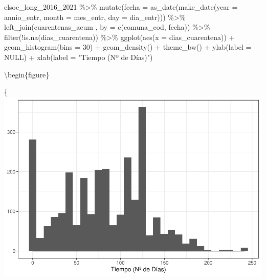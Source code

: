 \documentclass[
  12pt,
]{book}
\newenvironment{Shaded}{\begin{snugshade}}{\end{snugshade}}
\newcommand{\AttributeTok}[1]{\textcolor[rgb]{0.77,0.63,0.00}{#1}}
\newcommand{\ConstantTok}[1]{\textcolor[rgb]{0.00,0.00,0.00}{#1}}
\newcommand{\DecValTok}[1]{\textcolor[rgb]{0.00,0.00,0.81}{#1}}
\newcommand{\FunctionTok}[1]{\textcolor[rgb]{0.00,0.00,0.00}{#1}}
\newcommand{\NormalTok}[1]{#1}
\newcommand{\SpecialCharTok}[1]{\textcolor[rgb]{0.00,0.00,0.00}{#1}}
\newcommand{\StringTok}[1]{\textcolor[rgb]{0.31,0.60,0.02}{#1}}
\begin{document}
\begin{Shaded}
\begin{Highlighting}[]
\NormalTok{elsoc\_long\_2016\_2021 }\SpecialCharTok{\%\textgreater{}\%} 
  \FunctionTok{mutate}\NormalTok{(}\AttributeTok{fecha =} \FunctionTok{as\_date}\NormalTok{(}\FunctionTok{make\_date}\NormalTok{(}\AttributeTok{year =}\NormalTok{ annio\_entr, }\AttributeTok{month =}\NormalTok{ mes\_entr, }\AttributeTok{day =}\NormalTok{ dia\_entr))) }\SpecialCharTok{\%\textgreater{}\%} 
  \FunctionTok{left\_join}\NormalTok{(cuarentenas\_acum , }\AttributeTok{by =} \FunctionTok{c}\NormalTok{(}\StringTok{\textquotesingle{}comuna\_cod\textquotesingle{}}\NormalTok{, }\StringTok{\textquotesingle{}fecha\textquotesingle{}}\NormalTok{)) }\SpecialCharTok{\%\textgreater{}\%} 
  \FunctionTok{filter}\NormalTok{(}\SpecialCharTok{!}\FunctionTok{is.na}\NormalTok{(dias\_cuarentena)) }\SpecialCharTok{\%\textgreater{}\%} 
  \FunctionTok{ggplot}\NormalTok{(}\FunctionTok{aes}\NormalTok{(}\AttributeTok{x =}\NormalTok{ dias\_cuarentena)) }\SpecialCharTok{+} 
  \FunctionTok{geom\_histogram}\NormalTok{(}\AttributeTok{bins =} \DecValTok{30}\NormalTok{) }\SpecialCharTok{+} 
  \FunctionTok{geom\_density}\NormalTok{() }\SpecialCharTok{+}
  \FunctionTok{theme\_bw}\NormalTok{() }\SpecialCharTok{+}
  \FunctionTok{ylab}\NormalTok{(}\AttributeTok{label =} \ConstantTok{NULL}\NormalTok{) }\SpecialCharTok{+}
  \FunctionTok{xlab}\NormalTok{(}\AttributeTok{label =} \StringTok{"Tiempo (Nº de Días)"}\NormalTok{)}
\end{Highlighting}
\end{Shaded}

\textbackslash begin\{figure\}

\{\centering \includegraphics{reporte-elsoc_files/figure-latex/dias_cuarentena-heter-1}
\end{document}
